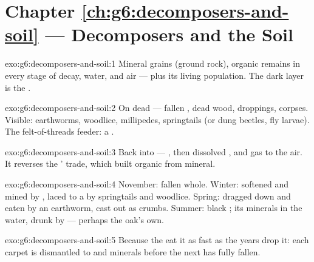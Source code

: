 \section*{Chapter \ref{ch:g6:decomposers-and-soil} --- Decomposers and the Soil}

\begin{solution}{exo:g6:decomposers-and-soil:1}
Mineral grains (ground rock), organic remains in every stage
of decay, water, and air --- plus its living population. The
dark layer is the .
\end{solution}

\begin{solution}{exo:g6:decomposers-and-soil:2}
On dead  --- fallen , dead wood,
droppings, corpses. Visible: earthworms, woodlice,
millipedes, springtails (or dung beetles, fly larvae). The
felt-of-threads feeder: a .
\end{solution}

\begin{solution}{exo:g6:decomposers-and-soil:3}
Back into  --- , then dissolved , and gas to the air. It reverses the ' trade,
which built organic from mineral.
\end{solution}

\begin{solution}{exo:g6:decomposers-and-soil:4}
November: fallen whole. Winter: softened and mined by ,
laced to a  by springtails and woodlice. Spring:
dragged down and eaten by an earthworm, cast out as crumbs.
Summer: black ; its minerals in the  water, drunk
by  --- perhaps the oak's own.
\end{solution}

\begin{solution}{exo:g6:decomposers-and-soil:5}
Because the  eat it as fast as the years drop it:
each carpet is dismantled to  and minerals before the
next has fully fallen.
\end{solution}

